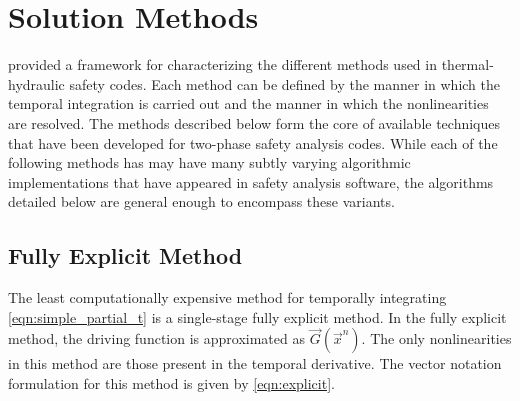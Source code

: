 \section{Solution Methods}
\label{sect:solution_techniques}
 provided a framework for characterizing the different methods used in thermal-hydraulic safety codes. 
Each method can be defined by the manner in which the temporal integration is carried out and the manner in which the nonlinearities are resolved.
The methods described below form the core of available techniques that have been developed for two-phase safety analysis codes. 
While each of the following methods has may have many subtly varying algorithmic implementations that have appeared in safety analysis software, the algorithms detailed below are general enough to encompass these variants.

\subsection{Fully Explicit Method}
\label{subsect:numerics_explicit}
The least computationally expensive method for temporally integrating \eqref{eqn:simple_partial_t} is a single-stage fully explicit method.
In the fully explicit method, the driving function is approximated as $\vec{G}(\vec{x}^n)$.
The only nonlinearities in this method are those present in the temporal derivative.
The vector notation formulation for this method is given by \eqref{eqn:explicit}. 

